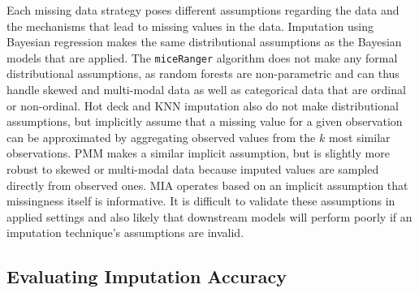 \documentclass{article}
\begin{document}
Each missing data strategy poses different assumptions regarding the
data and the mechanisms that lead to missing values in the data.
Imputation using Bayesian regression makes the same distributional
assumptions as the Bayesian models that are applied. The
\texttt{miceRanger} algorithm does not make any formal distributional
assumptions, as random forests are non-parametric and can thus handle
skewed and multi-modal data as well as categorical data that are ordinal
or non-ordinal. Hot deck and KNN imputation also do not make
distributional assumptions, but implicitly assume that a missing value
for a given observation can be approximated by aggregating observed
values from the \(k\) most similar observations. PMM makes a similar
implicit assumption, but is slightly more robust to skewed or
multi-modal data because imputed values are sampled directly from
observed ones. MIA operates based on an implicit assumption that
missingness itself is informative. It is difficult to validate these
assumptions in applied settings and also likely that downstream models
will perform poorly if an imputation technique's assumptions are
invalid.

\hypertarget{evaluating-imputation-accuracy}{%
\subsection{Evaluating Imputation
Accuracy}\label{evaluating-imputation-accuracy}}

\label{subsec:imputation_accuracy}
\end{document}
